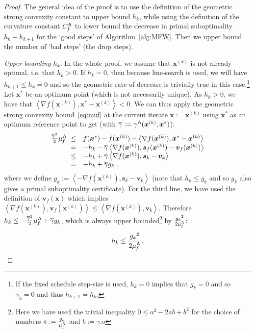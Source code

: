 \documentclass{article} %
\newcommand{\stepsize}{\gamma}
\newcommand{\away}{{\hspace{0.06em}\textsf{A}}}
\newcommand{\CfMFW}{C_{\hspace{-0.08em}f}^\away}
\newcommand{\strongConvMFW}{\mu_{\hspace{-0.08em}f}^\away}
\newcommand{\x}{\bm{x}}
\newcommand{\s}{\bm{s}}
\newcommand{\vv}{\bm{v}} %
\newcommand{\innerProd}[2]{\left\langle #1 , #2 \right\rangle}
\newcommand{\0}{\mathbf{0}} %
\begin{document}
\begin{proof}
The general idea of the proof is to use the definition of the geometric strong convexity constant to upper bound $h_k$, while using the definition of the curvature constant $\CfMFW$ to lower bound the decrease in primal suboptimality $h_k - h_{k+1}$ for the `good steps' of Algorithm~\ref{alg:MFW}. Then we upper bound the number of `bad steps' (the drop steps).

\emph{Upper bounding $h_k$.} In the whole proof, we assume that $\x^{(k)}$ is not already optimal, i.e. that $h_k > 0$. If $h_k = 0$, then because line-search is used, we will have $h_{k+1} \leq h_k = 0$ and so the geometric rate of decrease is trivially true in this case.\footnote{If the fixed schedule step-size is used, $h_k=0$ implies that $g_k=0$ and so $\stepsize_k = 0$ and thus $h_{k+1} = h_k$.} Let $\x^*$ be an optimum point (which is not necessarily unique). As $h_k > 0$, we have that $\innerProd{\nabla f(\x^{(k)})}{\x^*-\x^{(k)}} < 0$. We can thus apply the geometric strong convexity bound~\eqref{eq:muf} at the current iterate $\x:=\x^{(k)}$ using $\x^*$ as an optimum reference point to get (with $\overline{\stepsize} := \stepsize^\away(\x^{(k)}, \x^*)$):
\[
\begin{array}{rll}
\frac{{\overline{\stepsize}}^2}{2} \strongConvMFW \  \leq
&f(\x^*)-f(\x^{(k)}) -\left\langle \nabla f(\x^{(k)}) , \x^*-\x^{(k)} \right\rangle \\
=& -h_k - \overline{\stepsize} \left\langle  \nabla f(\x^{(k)}), \s_f(\x^{(k)}) - \vv_f(\x^{(k)})\right\rangle \\
\le &-h_k + \overline{\stepsize} \left\langle  \nabla f(\x^{(k)}), \s_k - \vv_k \right\rangle  \\
=&  -h_k + \overline{\stepsize}  g_k \ ,
\end{array}
\]
where we define $g_k :=  \left\langle  -\nabla f(\x^{(k)}), \s_k - \vv_k \right\rangle$ (note that $h_k \leq g_k$ and so $g_k$ also gives a primal suboptimality certificate). %
For the third line, we have used the definition of $\vv_f(\x)$ which implies $\left\langle  \nabla f(\x^{(k)}), \vv_f(\x^{(k)})\right\rangle \leq \left\langle  \nabla f(\x^{(k)}),\vv_k \right\rangle$. %
Therefore $h_k \le -\frac{{\overline{\stepsize}}^2}{2} \strongConvMFW + \overline{\stepsize} g_k$,
which is always upper bounded\footnote{Here we have used the trivial inequality $0 \le %
a^2-2ab+b^2$ for the choice of numbers $a:=\frac{g_k}{\strongConvMFW}$ and $b:=\overline{\stepsize}$.o} by $\frac{{g_k}^2}{2\strongConvMFW}$:\vspace{-2mm}
\begin{equation} \label{eq:hUpperBound}
h_k \leq  \frac{{g_k}^2}{2\strongConvMFW}.
\end{equation}


\end{proof}
\end{document}
